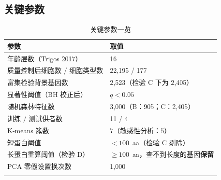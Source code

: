 \documentclass[numsec,webpdf,modern,large]{oup-authoring-template}
\begin{document}
\begin{appendices}
\section{关键参数}

\begin{table}[H]
  \centering
  \caption{关键参数一览}
  \label{tab:params}
  \small
  \begin{tabularx}{\textwidth}{@{}lX@{}}
    \toprule
    参数 & 取值 \\
    \midrule
    年龄层数（Trigos 2017） & 16 \\
    质量控制后细胞数 / 细胞类型数 & 22,195 / 177 \\
    富集检验背景基因数 & 2,523（检验 C 下为 2,405） \\
    显著性阈值（BH 校正后） & $q < 0.05$ \\
    随机森林特征数 & 3,000（B：905；C：2,405） \\
    训练 / 测试供者数 & 11 / 4 \\
    K-means 簇数 & 7（敏感性分析：5） \\
    短蛋白阈值 & $< 100$~aa（检验 C 剔除） \\
    长蛋白重算阈值（检验 D） & $\ge 100$~aa，查不到长度的基因\textbf{保留} \\
    PCA 零假设置换次数 & 1,000 \\
    \botrule
  \end{tabularx}
\end{table}

\end{appendices}
\end{document}
